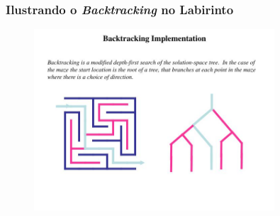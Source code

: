 \begin{frame}[fragile]
\frametitle{Ilustrando o \textit{Backtracking} no Labirinto}

\begin{figure}[!htb]
\begin{center}
\includegraphics[width=0.80\textwidth, height=0.90\textheight]{figures/ilustra_backtracking_01.jpg}
\end{center}
\end{figure}
\end{frame}


